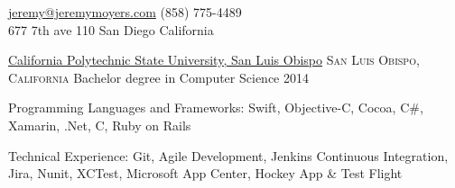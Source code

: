 \documentclass[10pt,a4paper]{article}
\begin{document}
\sloppy  %



\nobreakvspace{0.3em}  %

\noindent\href{mailto:jeremy.at.jeremymoyers.coml}{jeremy\mbox{}@\mbox{}jeremymoyers.com}\sbull
(858) 775-4489
\\
677 7th ave 110\sbull
San Diego\thinspace {\large \sc }\sbull
California

\spacedhrule{0.9em}{-0.4em}  %


\headedsection
  {\href{https://www.calpoly.edu}{California Polytechnic State University, San Luis Obispo}}
  {\textsc{San Luis Obispo, California}} {%
  \headedsubsection
    {Bachelor degree in Computer Science}
    {2014}
    {\bodytext{}}
}
\vspace{-0.8em}


\spacedhrule{0.5em}{-0.4em}


\inlineheadsection  %
  {Programming Languages and Frameworks:}
  {Swift, Objective-C, Cocoa, C\#, Xamarin, .Net, C, Ruby on Rails }

\vspace{0.2em}
\inlineheadsection
  {Technical Experience:}
  {Git, Agile Development, Jenkins Continuous Integration, Jira, Nunit, XCTest, Microsoft App Center, Hockey App \& Test Flight }


\spacedhrule{1.6em}{-0.4em}

\end{document}

